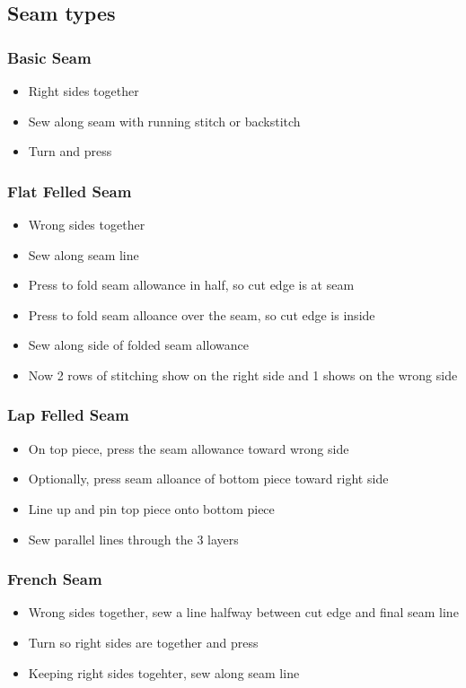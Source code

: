\documentclass{beamer}
\begin{document}
\subsection{Seam types}

\begin{frame}[fragile]
\tableofcontents[currentsubsection]
\end{frame}


\begin{frame}[fragile]
\frametitle{Basic Seam}
\begin{itemize}
\item Right sides together
\item Sew along seam with running stitch or backstitch
\item Turn and press
\end{itemize}
\end{frame}

\begin{frame}[fragile]
\frametitle{Flat Felled Seam}
\begin{itemize}
\item Wrong sides together
\item Sew along seam line
\item Press to fold seam allowance in half, so cut edge is at seam
\item Press to fold seam alloance over the seam, so cut edge is inside
\item Sew along side of folded seam allowance
\item Now 2 rows of stitching show on the right side and 1 shows on the wrong side
\end{itemize}
\end{frame}

\begin{frame}[fragile]
\frametitle{Lap Felled Seam}
\begin{itemize}
\item On top piece, press the seam allowance toward wrong side
\item Optionally, press seam alloance of bottom piece toward right side
\item Line up and pin top piece onto bottom piece
\item Sew parallel lines through the 3 layers
\end{itemize}
\end{frame}

\begin{frame}[fragile]
\frametitle{French Seam}
\begin{itemize}
\item Wrong sides together, sew a line halfway between cut edge and final seam line
\item Turn so right sides are together and press
\item Keeping right sides togehter, sew along seam line
\end{itemize}
\end{frame}
\end{document}
